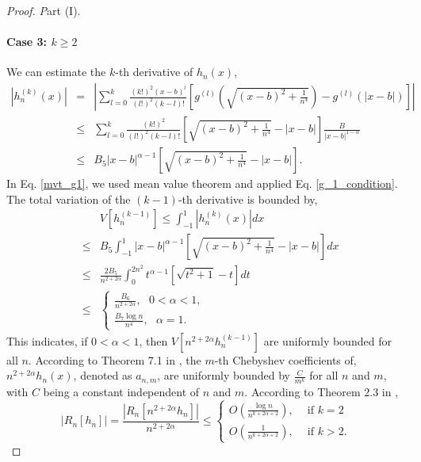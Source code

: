 \documentclass[11pt]{article}
\begin{document}
\begin{proof} {\textit Part (I).}
\paragraph{Case 3: $k \geq 2$} We can estimate the $k$-th derivative of $h_n(x)$,
\begin{eqnarray}
    |h_n^{(k)}(x)| &=& \left|\sum_{l=0}^k \frac{(k!)^2 (x-b)^{l}}{(l!)^2(k-l)!} \left[g^{(l)}(\sqrt{(x-b)^2+\frac{1}{n^4}})-g^{(l)}(|x-b|)\right]\right| \\
    &\leq& \sum_{l=0}^k \frac{(k!)^2}{(l!)^2(k-l)!} \left[\sqrt{(x-b)^2+\frac{1}{n^4}}-|x-b|\right] \frac{B}{|x-b|^{1-\alpha}}\label{mvt_g1}\\
    &\leq&  B_5 |x-b|^{\alpha-1}\left[\sqrt{(x-b)^2+\frac{1}{n^4}}-|x-b|\right].
    \label{h_n_k_estimate}
\end{eqnarray}
In Eq. \eqref{mvt_g1}, we used mean value theorem and applied Eq. \eqref{g_1_condition}. The total variation of the $(k-1)$-th derivative is bounded by,
\begin{eqnarray}
    &&V[h_n^{(k-1)}] \leq \int_{-1}^1 |h_n^{(k)}(x)| dx \\
    &\leq& B_5\int_{-1}^1 |x-b|^{\alpha-1}\left[\sqrt{(x-b)^2+\frac{1}{n^4}}-|x-b|\right] dx
    \\
    &\leq& \frac{2B_5}{n^{2+2\alpha}}\int_{0}^{2n^2} t^{\alpha-1}\left[\sqrt{t^2+1}-t\right] dt \\
    &\leq& \begin{cases}
        \displaystyle \frac{B_{6}}{n^{2+2\alpha}},\ \ \ 0<\alpha<1,\\
        \displaystyle \frac{B_{7}\log n}{n^{4}},\ \ \ \alpha=1.
    \end{cases} \label{BV_h_n_k}
\end{eqnarray}
This indicates, if $0<\alpha<1$, then $V[n^{2+2\alpha}h_n^{(k-1)}]$ are uniformly bounded for all $n$. According to Theorem 7.1 in \cite{trefethen2019approximation}, the $m$-th Chebyshev coefficients of, $n^{2+2\alpha}h_n(x)$, denoted as $a_{n,m}$, are uniformly bounded by $\frac{C}{m^k}$ for all $n$ and $m$, with $C$ being a constant independent of $n$ and $m$. According to Theorem 2.3 in \cite{xiang2016improved},
\begin{equation}
    \displaystyle |R_n[h_n]| = \frac{|R_n[n^{2+2\alpha}h_n]|}{n^{2+2\alpha}}  \leq \begin{cases}
        O(\frac{\log n}{n^{k+2\alpha+2}}), \ \ \ \ \text{ if } k = 2\\
        O(\frac{1}{n^{k+2\alpha+2}}), \ \ \ \ \text{ if } k > 2.
    \end{cases}  \label{R_n_h_large}

\end{equation}
\end{proof}
\end{document}
